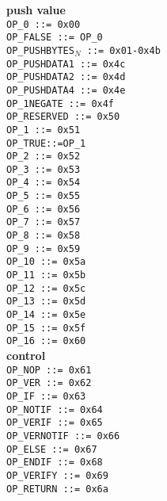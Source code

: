 \documentclass{article}
\begin{document}
\begin{multicols}{3}

\textbf{\centering push value} \\
\texttt{OP\_0 ::= 0x00  } \\
\texttt{OP\_FALSE ::= OP\_0  } \\
\texttt{{OP\_PUSHBYTES$_N$} ::= 0x01-0x4b} \\
\texttt{OP\_PUSHDATA1 ::= 0x4c  } \\
\texttt{OP\_PUSHDATA2 ::= 0x4d  } \\
\texttt{OP\_PUSHDATA4 ::= 0x4e  } \\
\texttt{OP\_1NEGATE ::= 0x4f  } \\
\texttt{OP\_RESERVED ::= 0x50  } \\
\texttt{OP\_1 ::= 0x51  } \\
\texttt{OP\_TRUE::=OP\_1  } \\
\texttt{OP\_2 ::= 0x52  } \\
\texttt{OP\_3 ::= 0x53  } \\
\texttt{OP\_4 ::= 0x54  } \\
\texttt{OP\_5 ::= 0x55  } \\
\texttt{OP\_6 ::= 0x56  } \\
\texttt{OP\_7 ::= 0x57  } \\
\texttt{OP\_8 ::= 0x58  } \\
\texttt{OP\_9 ::= 0x59  } \\
\texttt{OP\_10 ::= 0x5a  } \\
\texttt{OP\_11 ::= 0x5b  } \\
\texttt{OP\_12 ::= 0x5c  } \\
\texttt{OP\_13 ::= 0x5d  } \\
\texttt{OP\_14 ::= 0x5e  } \\
\texttt{OP\_15 ::= 0x5f  } \\
\texttt{OP\_16 ::= 0x60  } \\

\textbf{\centering control} \\
\texttt{OP\_NOP ::= 0x61  } \\
\texttt{OP\_VER ::= 0x62  } \\
\texttt{OP\_IF ::= 0x63  } \\
\texttt{OP\_NOTIF ::= 0x64  } \\
\texttt{OP\_VERIF ::= 0x65  } \\
\texttt{OP\_VERNOTIF ::= 0x66  } \\
\texttt{OP\_ELSE ::= 0x67  } \\
\texttt{OP\_ENDIF ::= 0x68  } \\
\texttt{OP\_VERIFY ::= 0x69  } \\
\texttt{OP\_RETURN ::= 0x6a  } \\


\end{multicols}
\end{document}

